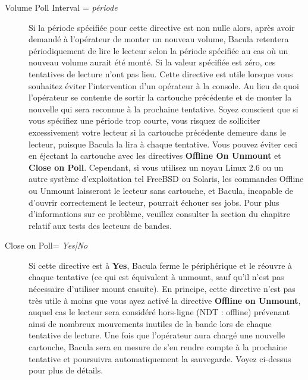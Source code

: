 \begin{description}
\item [Volume Poll Interval = {\it p\'eriode}]
   Si la p\'eriode sp\'ecifi\'ee pour cette directive est non nulle alors, apr\`es avoir 
   demand\'e \`a l'op\'erateur de monter un nouveau volume, Bacula retentera 
   p\'eriodiquement de lire le lecteur selon la p\'eriode sp\'ecifi\'ee au cas o\`u un 
   nouveau volume aurait \'et\'e mont\'e. Si la valeur sp\'ecifi\'ee est z\'ero, ces 
   tentatives de lecture n'ont pas lieu. Cette directive est utile lorsque 
   vous souhaitez \'eviter l'intervention d'un op\'erateur \`a la console. Au lieu de 
   quoi l'op\'erateur se contente de sortir la cartouche pr\'ec\'edente et de monter la 
   nouvelle qui sera reconnue \`a la prochaine tentative. Soyez conscient que si vous 
   sp\'ecifiez une p\'eriode trop courte, vous risquez de solliciter excessivement 
   votre lecteur si la cartouche pr\'ec\'edente demeure dans le lecteur, puisque Bacula 
   la lira \`a chaque tentative. Vous pouvez \'eviter ceci en \'ejectant la cartouche avec 
   les directives {\bf Offline On Unmount} et  {\bf Close on Poll}.
   Cependant, si vous utilisez un noyau Linux 2.6 ou un autre syst\`eme d'exploitation tel 
   FreeBSD ou Solaris, les commandes Offline ou Unmount laisseront le lecteur sans cartouche, 
   et Bacula, incapable de d'ouvrir correctement le lecteur, pourrait \'echouer ses jobs. 
   Pour plus d'informations sur ce probl\`eme, veuillez consulter la section 
     du chapitre relatif 
   aux tests des lecteurs de bandes.

\item [Close on Poll= {\it Yes|No}]
   Si cette directive est \`a {\bf Yes}, Bacula ferme le p\'eriph\'erique et le r\'eouvre 
   \`a chaque tentative (ce qui est \'equivalent \`a unmount, sauf qu'il n'est pas 
   n\'ecessaire d'utiliser mount ensuite). En principe, cette directive n'est 
   pas tr\`es utile \`a moins que vous ayez activ\'e la directive  {\bf Offline on Unmount}, 
   auquel cas le lecteur sera consid\'er\'e hors-ligne (NDT : offline) pr\'evenant ainsi 
   de nombreux mouvements inutiles de la bande lors de chaque tentative de lecture. 
   Une fois que l'op\'erateur aura charg\'e une nouvelle cartouche, Bacula 
   sera en mesure de s'en rendre compte \`a la prochaine tentative  et poursuivra 
   automatiquement la sauvegarde. Voyez ci-dessus pour plus de d\'etails. 
   

\end{description}
